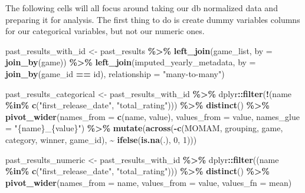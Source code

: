 \documentclass[
]{article}
\newenvironment{Shaded}{\begin{snugshade}}{\end{snugshade}}
\newcommand{\AttributeTok}[1]{\textcolor[rgb]{0.13,0.29,0.53}{#1}}
\newcommand{\DecValTok}[1]{\textcolor[rgb]{0.00,0.00,0.81}{#1}}
\newcommand{\FunctionTok}[1]{\textcolor[rgb]{0.13,0.29,0.53}{\textbf{#1}}}
\newcommand{\NormalTok}[1]{#1}
\newcommand{\OtherTok}[1]{\textcolor[rgb]{0.56,0.35,0.01}{#1}}
\newcommand{\SpecialCharTok}[1]{\textcolor[rgb]{0.81,0.36,0.00}{\textbf{#1}}}
\newcommand{\StringTok}[1]{\textcolor[rgb]{0.31,0.60,0.02}{#1}}
\begin{document}
The following cells will all focus around taking our db normalized data
and preparing it for analysis. The first thing to do is create dummy
variables columns for our categorical variables, but not our numeric
ones.

\begin{Shaded}
\begin{Highlighting}[]
\NormalTok{past\_results\_with\_id }\OtherTok{\textless{}{-}}\NormalTok{ past\_results }\SpecialCharTok{\%\textgreater{}\%}
  \FunctionTok{left\_join}\NormalTok{(game\_list, }\AttributeTok{by =} \FunctionTok{join\_by}\NormalTok{(game)) }\SpecialCharTok{\%\textgreater{}\%}
  \FunctionTok{left\_join}\NormalTok{(imputed\_yearly\_metadata, }\AttributeTok{by =} \FunctionTok{join\_by}\NormalTok{(game\_id }\SpecialCharTok{==}\NormalTok{ id), }\AttributeTok{relationship =} \StringTok{"many{-}to{-}many"}\NormalTok{)}

\NormalTok{past\_results\_categorical }\OtherTok{\textless{}{-}}\NormalTok{ past\_results\_with\_id }\SpecialCharTok{\%\textgreater{}\%}
\NormalTok{  dplyr}\SpecialCharTok{::}\FunctionTok{filter}\NormalTok{(}\SpecialCharTok{!}\NormalTok{(name }\SpecialCharTok{\%in\%} \FunctionTok{c}\NormalTok{(}\StringTok{"first\_release\_date"}\NormalTok{, }\StringTok{"total\_rating"}\NormalTok{))) }\SpecialCharTok{\%\textgreater{}\%}
  \FunctionTok{distinct}\NormalTok{() }\SpecialCharTok{\%\textgreater{}\%}
  \FunctionTok{pivot\_wider}\NormalTok{(}\AttributeTok{names\_from =} \FunctionTok{c}\NormalTok{(name, value), }\AttributeTok{values\_from =}\NormalTok{ value,}
              \AttributeTok{names\_glue =} \StringTok{"\{name\}\_\{value\}"}\NormalTok{) }\SpecialCharTok{\%\textgreater{}\%}
  \FunctionTok{mutate}\NormalTok{(}\FunctionTok{across}\NormalTok{(}\SpecialCharTok{{-}}\FunctionTok{c}\NormalTok{(MOMAM, grouping, game, category, winner, game\_id),}
                \SpecialCharTok{\textasciitilde{}} \FunctionTok{ifelse}\NormalTok{(}\FunctionTok{is.na}\NormalTok{(.), }\DecValTok{0}\NormalTok{, }\DecValTok{1}\NormalTok{)))}

\NormalTok{past\_results\_numeric }\OtherTok{\textless{}{-}}\NormalTok{ past\_results\_with\_id }\SpecialCharTok{\%\textgreater{}\%}
\NormalTok{  dplyr}\SpecialCharTok{::}\FunctionTok{filter}\NormalTok{((name }\SpecialCharTok{\%in\%} \FunctionTok{c}\NormalTok{(}\StringTok{"first\_release\_date"}\NormalTok{, }\StringTok{"total\_rating"}\NormalTok{))) }\SpecialCharTok{\%\textgreater{}\%}
  \FunctionTok{distinct}\NormalTok{() }\SpecialCharTok{\%\textgreater{}\%}
  \FunctionTok{pivot\_wider}\NormalTok{(}\AttributeTok{names\_from =}\NormalTok{ name, }\AttributeTok{values\_from =}\NormalTok{ value, }\AttributeTok{values\_fn =}\NormalTok{ mean)}


\end{Highlighting}
\end{Shaded}
\end{document}
